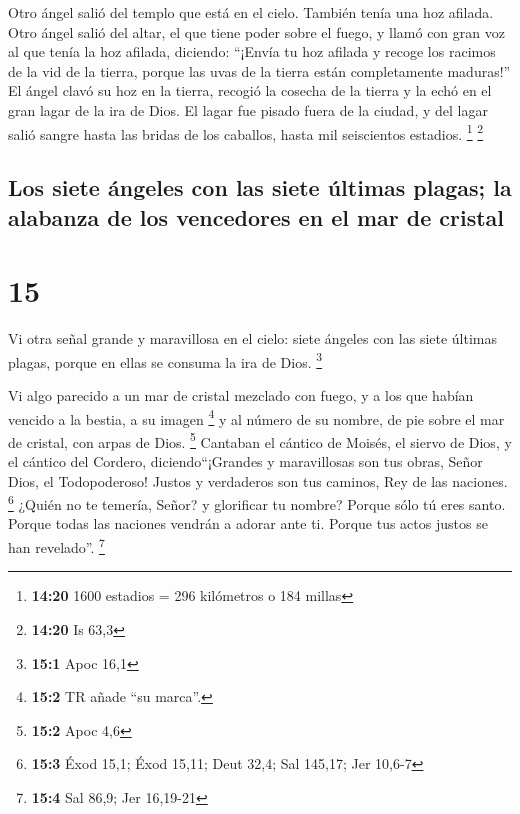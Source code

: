  Otro ángel salió del templo que está en el cielo.
También tenía una hoz afilada.  Otro ángel salió del
altar, el que tiene poder sobre el fuego, y llamó con gran voz al que
tenía la hoz afilada, diciendo: ``¡Envía tu hoz afilada y recoge los
racimos de la vid de la tierra, porque las uvas de la tierra están
completamente maduras!''  El ángel clavó su hoz en la
tierra, recogió la cosecha de la tierra y la echó en el gran lagar de la
ira de Dios.  El lagar fue pisado fuera de la ciudad, y
del lagar salió sangre hasta las bridas de los caballos, hasta mil
seiscientos estadios. \footnote{\textbf{14:20} 1600 estadios = 296
  kilómetros o 184 millas} \footnote{\textbf{14:20} Is 63,3}

\hypertarget{los-siete-uxe1ngeles-con-las-siete-uxfaltimas-plagas-la-alabanza-de-los-vencedores-en-el-mar-de-cristal}{%
\subsection{Los siete ángeles con las siete últimas plagas; la alabanza
de los vencedores en el mar de
cristal}\label{los-siete-uxe1ngeles-con-las-siete-uxfaltimas-plagas-la-alabanza-de-los-vencedores-en-el-mar-de-cristal}}

\hypertarget{section-14}{%
\section{15}\label{section-14}}

 Vi otra señal grande y maravillosa en el cielo: siete
ángeles con las siete últimas plagas, porque en ellas se consuma la ira
de Dios. \footnote{\textbf{15:1} Apoc 16,1}

 Vi algo parecido a un mar de cristal mezclado con fuego,
y a los que habían vencido a la bestia, a su imagen \footnote{\textbf{15:2}
  TR añade ``su marca''.} y al número de su nombre, de pie sobre el mar
de cristal, con arpas de Dios. \footnote{\textbf{15:2} Apoc 4,6}
 Cantaban el cántico de Moisés, el siervo de Dios, y el
cántico del Cordero, diciendo``¡Grandes y maravillosas son tus obras,
Señor Dios, el Todopoderoso! Justos y verdaderos son tus caminos, Rey de
las naciones. \footnote{\textbf{15:3} Éxod 15,1; Éxod 15,11; Deut 32,4;
  Sal 145,17; Jer 10,6-7}  ¿Quién no te temería, Señor? y
glorificar tu nombre? Porque sólo tú eres santo. Porque todas las
naciones vendrán a adorar ante ti. Porque tus actos justos se han
revelado''. \footnote{\textbf{15:4} Sal 86,9; Jer 16,19-21}

